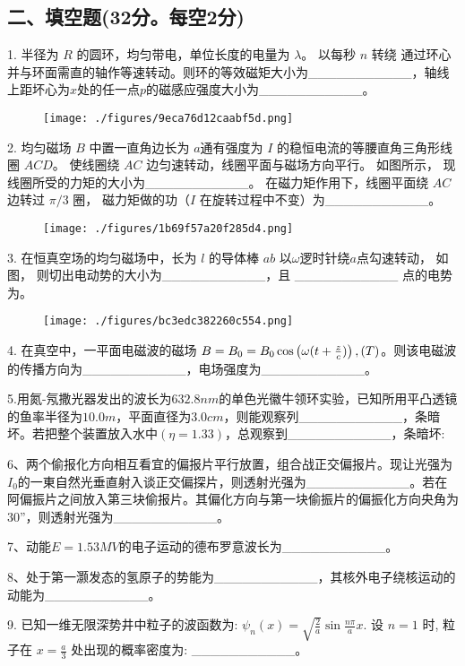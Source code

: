 \subsection{二、填空题(32分。每空2分)}
1. 半径为 $R$ 的圆环，均匀带电，单位长度的电量为 $\lambda$。 以每秒 $n$ 转绕 通过环心并与环面需直的轴作等速转动。则环的等效磁矩大小为___________，轴线上距坏心为$x$处的任一点$p$的磁感应强度大小为___________。
\begin{figure}[ht]
\centering
\texttt{[image: ./figures/9eca76d12caabf5d.png]}
\caption{} \label{fig_NJU10_2}
\end{figure}
2. 均匀磁场 $B$ 中置一直角边长为 $a$通有强度为 $I$ 的稳恒电流的等腰直角三角形线圈 $ACD$。 使线圈绕 $AC$ 边匀速转动，线圈平面与磁场方向平行。 如图所示， 现线圈所受的力矩的大小为___________。 在磁力矩作用下，线圈平面绕 $AC$ 边转过 $\pi/3$ 圈， 磁力矩做的功（$I$ 在旋转过程中不变）为___________。
\begin{figure}[ht]
\centering
\texttt{[image: ./figures/1b69f57a20f285d4.png]}
\caption{} \label{fig_NJU10_3}
\end{figure}
3. 在恒真空场的均匀磁场中，长为 $l$ 的导体棒 $ab$ 以$\omega$逻时针绕$a$点勾速转动， 如图， 则切出电动势的大小为___________，且 ___________ 点的电势为。
\begin{figure}[ht]
\centering
\texttt{[image: ./figures/bc3edc382260c554.png]}
\caption{} \label{fig_NJU10_4}
\end{figure}
4. 在真空中，一平面电磁波的磁场 $B = B_0 = B_0 \cos \left( \omega (t + \frac{z}{c} )\right) \\, (T)$。则该电磁波的传播方向为___________，电场强度为___________。

5.用氮-氖撒光器发出的波长为$632.8nm$的单色光徽牛领环实验，已知所用平凸透镜的鱼率半径为$10.0m$，平面直径为$3.0cm$，则能观察列___________，条暗坏。若把整个装置放入水中$(\eta=1.33)$，总观察到___________，条暗坏:

6、两个偷报化方向相互看宜的偏报片平行放置，组合战正交偏报片。现让光强为$I_0$的一東自然光垂直射入谈正交偏探片，则透射光强为___________。若在阿偏振片之间放入第三块偷报片。其偏化方向与第一块偷振片的偏振化方向央角为 30”，则透射光强为___________。

7、动能$E=1.53MV$的电子运动的德布罗意波长为___________。

8、处于第一灏发态的氢原子的势能为___________，其核外电子绕核运动的动能为___________。

9. 已知一维无限深势井中粒子的波函数为: $\psi_n(x) = \sqrt{\frac{2}{a}} \sin{\frac{n \pi }{a}}x$. 设 $n = 1$ 时, 粒子在 $x = \frac{a}{3}$ 处出现的概率密度为: ___________。
